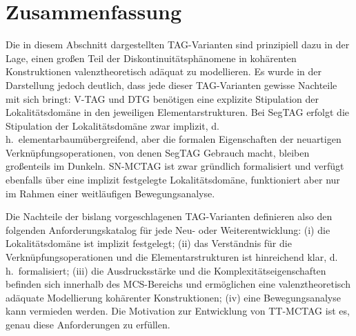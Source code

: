 \section{Zusammenfassung}

Die in diesem Abschnitt dargestellten TAG-Varianten sind prinzipiell dazu in der Lage, einen gro\ss en Teil der Diskontinuitätsphänomene in kohärenten Konstruktionen valenztheoretisch adäquat zu modellieren. Es wurde in der Darstellung jedoch deutlich, dass jede dieser TAG-Varianten gewisse Nachteile mit sich bringt: V-TAG und DTG benötigen eine explizite Stipulation der Lokalitätsdomäne in den jeweiligen Elementarstrukturen. Bei SegTAG erfolgt die Stipulation der Lokalitätsdomäne zwar implizit, d.\,h.\ elementarbaumübergreifend, aber die formalen Eigenschaften der neuartigen Verknüpfungsoperationen, von denen SegTAG Gebrauch macht, bleiben gro\ss enteils im Dunkeln. SN-MCTAG ist zwar gründlich formalisiert und verfügt ebenfalls über eine implizit festgelegte Lokalitätsdomäne, funktioniert aber nur im Rahmen einer weitläufigen Bewegungsanalyse. 

Die Nachteile der bislang vorgeschlagenen TAG-Varianten definieren also den folgenden Anforderungskatalog für jede Neu- oder Weiterentwicklung: (i) die Lokalitätsdomäne ist implizit festgelegt; (ii) das Verständnis für die Verknüpfungsoperationen und die Elementarstrukturen ist hinreichend klar, d.\,h.\ formalisiert; (iii) die Ausdrucksstärke und die Komplexitätseigenschaften befinden sich innerhalb des MCS-Bereichs und ermöglichen eine valenztheoretisch adäquate Modellierung kohärenter Konstruktionen; (iv) eine Bewegungsanalyse kann vermieden werden. Die Motivation zur Entwicklung von TT-MCTAG ist es, genau diese Anforderungen zu erfüllen. 




















 

